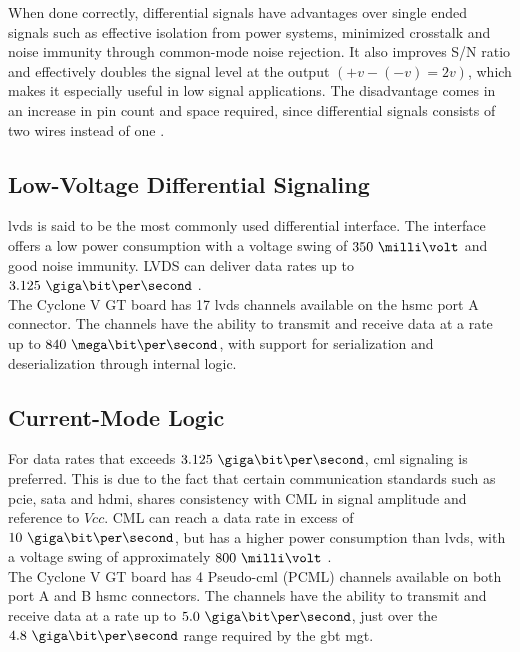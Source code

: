 \documentclass[main.tex]{subfiles}
\begin{document}
When done correctly, differential signals have advantages over single ended signals such as effective isolation from power systems, minimized crosstalk and noise immunity through common-mode noise rejection. It also improves S/N ratio and effectively doubles the signal level at the output $(+v - (-v) = 2v)$, which makes it especially useful in low signal applications. The disadvantage comes in an increase in pin count and space required, since differential signals consists of two wires instead of one \cite{douglas01}.

\subsection{Low-Voltage Differential Signaling}

\gls{lvds} is said to be the most commonly used differential interface. The interface offers a low power consumption with a voltage swing of $350\ \milli\volt$ and good noise immunity. LVDS can deliver data rates up to $3.125\ \giga\bit\per\second$ \cite{ti08lvds}.\\

The Cyclone V GT board has 17 \gls{lvds} channels available on the \gls{hsmc} port A connector. The channels have the ability to transmit and receive data at a rate up to $840\ \mega\bit\per\second$, with support for serialization and deserialization through internal logic. \cite{altera_cvoverview15}

\subsection{Current-Mode Logic}

For data rates that exceeds $3.125\ \giga\bit\per\second$, \gls{cml} signaling is preferred. This is due to the fact that certain communication standards such as \acrshort{pcie}, \acrshort{sata} and \acrshort{hdmi}, shares consistency with CML in signal amplitude and reference to $Vcc$. CML can reach a data rate in excess of $10\ \giga\bit\per\second$, but has a higher power consumption than \gls{lvds}, with a voltage swing of approximately $800\ \milli\volt$ \cite{ti08lvds}.\\

The Cyclone V GT board has 4 Pseudo-\gls{cml} (PCML) channels available on both port A and B \gls{hsmc} connectors. The channels have the ability to transmit and receive data at a rate up to $5.0\ \giga\bit\per\second$, just over the $4.8\ \giga\bit\per\second$ range required by the \gls{gbt} \gls{mgt}. \cite{altera_cyclonekit}
\end{document}
